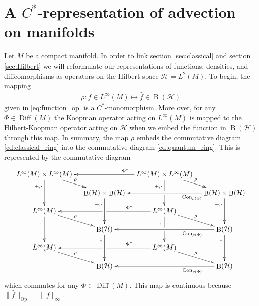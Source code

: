 \documentclass[12pt]{amsart}
\renewcommand{\H}{\ensuremath{\mathcal{H}}}
\DeclareMathOperator{\Diff}{Diff}
\DeclareMathOperator{\B}{B}
\DeclareMathOperator{\Op}{Op}
\DeclareMathOperator{\Con}{Con}
\begin{document}
\section{A $C^*$-representation of advection on manifolds}
\label{sec:embedding}
Let $M$ be a compact manifold.
In order to link section \ref{sec:classical} and section \ref{sec:Hilbert}
we will reformulate our representations of functions, densities, and diffeomorphisms as operators on the Hilbert space $\H = L^2(M)$.
To begin, the mapping
\begin{align*}
	\rho: f \in L^\infty(M) \mapsto \hat{f} \in \B(\H)
\end{align*}
given in \eqref{eq:function_op} is a $C^*$-monomorphism.
More over, for any $\Phi \in \Diff(M)$ the Koopman operator acting on $L^\infty(M)$ is mapped to the Hilbert-Koopman operator acting on $\H$ when we embed the function in $\B( \H )$ through this map.
In summary, the map $\rho$ embeds the commutative diagram \eqref{cd:classical_ring} into the commutative diagram \eqref{cd:quantum_ring}.
This is represented by the commutative diagram
\begin{align*}
	\xymatrix@=1em{
		L^\infty(M) \times L^\infty(M) \ar[dr]^{\rho} \ar[dd]_<(0.2){+,\cdot} & & \ar[ll]_<(0.1){ \Phi^*} L^\infty(M) \times L^\infty(M) \ar[dr]^{\rho} \ar[dd]_<(0.2){+,\cdot}|!{[dr];[dl]}\hole \\
		& \B( \H ) \times \B(\H) \ar[dd]_<(0.2){+,\cdot} & & \ar[ll]^<(0.1){\Con_{\rho(\Phi)}} \B(\H) \times \B(\H) \ar[dd]_<(0.2){+,\cdot} \\
		L^\infty(M) \ar[dr]^{\rho} \ar[dd]_<(0.2){\dagger} & & \ar[ll]_<(0.2){\Phi^*}|!{[ul];[dl]}\hole L^\infty(M) \ar[dr]^{\rho} \ar[dd]_<(0.2){\dagger}|!{[dr];[dl]}\hole \\
		& \B(\H) \ar[dd]_<(0.2){\dagger} & & \ar[ll]^<(0.2){\Con_{\rho(\Phi)}} \B(\H) \ar[dd]_<(0.2){\dagger} \\
		L^\infty(M) \ar[dr]^{\rho} & & \ar[ll]_<(0.2){\Phi^*}|!{[ul];[dl]}\hole L^\infty(M) \ar[dr]^{\rho} \\
		& \B(\H) & & \ar[ll]^<(0.2){\Con_{\rho(\Phi)}} \B(\H)
	}
\end{align*}
which commutes for any $\Phi \in \Diff(M)$.
This map is continuous because $\| \hat{f} \|_{\Op} = \| f \|_{\infty}$.
\end{document}
